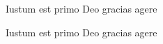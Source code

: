 \documentclass{memoir}
\begin{document}
\makeatletter



\beginnumbering
{}
\pstart
{}
Iustum est primo Deo gracias agere 
\pend
\pausenumbering

\clearforchapter
\resumenumbering

\pstart
{}
Iustum est primo Deo gracias agere
\pend
\endnumbering
\end{document}
